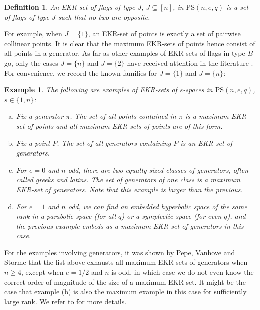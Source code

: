 \documentclass[11pt]{article}
\newtheorem{de}[thm]{Definition}
\newtheorem{example}[thm]{Example}
\newcommand{\PS}{\mathrm{PS}}
\renewcommand{\geq}{\geqslant}
\begin{document}
\begin{de}
    An \emph{EKR-set of flags of type $J$}, $J \subseteq [n]$, in $\PS(n,e,q)$ is a set of flags of type $J$ such that no two are opposite. 
\end{de}

For example, when $J = \{1\}$, an EKR-set of points is exactly a set of pairwise collinear points. It is clear that the maximum EKR-sets of points hence consist of all points in a generator. As far as other examples of EKR-sets of flags in type $B$ go, only the cases $J=\{n\}$ and $J=\{2\}$ have received attention in the literature \cite{metsch_pairwise-non-opp-lines, EKR_polarspace_generators}. For convenience, we record the known families for $J = \{1\}$ and $J = \{n\}$: 

\begin{example}\label{E: EKR for s-spaces}
    The following are examples of EKR-sets of $s$-spaces in $\PS(n,e,q)$, $s \in \{1,n\}$:
    \begin{enumerate}[(a)]
        \item Fix a generator $\pi$. The set of all points contained in $\pi$ is a maximum EKR-set of points and all maximum EKR-sets of points are of this form.
        \item Fix a point $P$. The set of all generators containing $P$ is an EKR-set of generators.
        \item For $e = 0$ and $n$ odd, there are two equally sized classes of generators, often called greeks and latins. The set of generators of one class is a maximum EKR-set of generators. Note that this example is larger than the previous.
        \item For $e = 1$ and $n$ odd, we can find an embedded hyperbolic space of the same rank in a parabolic space (for all $q$) or a symplectic space (for even $q$), and the previous example embeds as a maximum EKR-set of generators in this case. 
    \end{enumerate}
\end{example}

For the examples involving generators, it was shown by Pepe, Vanhove and Storme \cite{EKR_polarspace_generators} that the list above exhausts all maximum EKR-sets of generators when $n \geq 4$, except when $e = 1/2$ and $n$ is odd, in which case we do not even know the correct order of magnitude of the size of a maximum EKR-set. It might be the case that example (b) is also the maximum example in this case for sufficiently large rank. We refer to \cite{EKR_polarspace_generators} for more details. 
\end{document}
